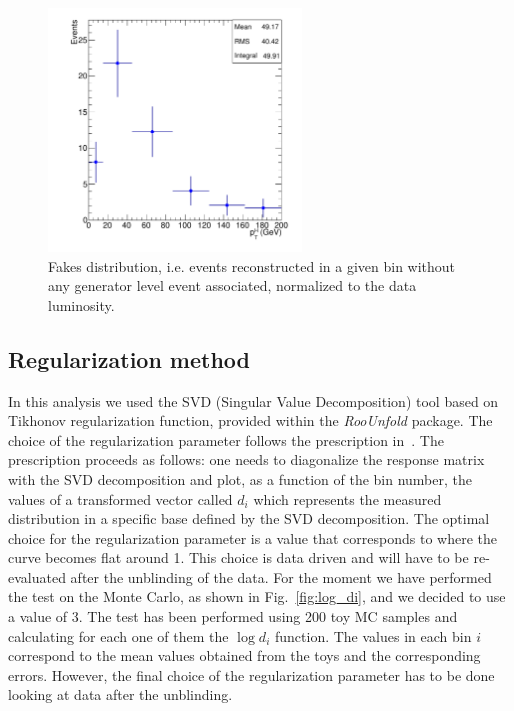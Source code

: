 \begin{figure}[b]
\centering
\includegraphics[width=0.6\textwidth]{images/fakes.pdf}
\caption{Fakes distribution, i.e. events reconstructed in a given bin without any generator level event associated, normalized to the data luminosity.}
\label{fig:fakes}
\end{figure}

\subsection{Regularization method}\label{sec:regularization}
In this analysis we used the SVD (Singular Value Decomposition) tool based on Tikhonov regularization function, provided within the \textit{RooUnfold} package. The choice of the regularization parameter follows the prescription in~\cite{Hocker:1995kb}. The prescription proceeds as follows: one needs to diagonalize the response matrix with the SVD decomposition and plot, as a function of the bin number, the values of a transformed vector called $d_{i}$ which represents the measured distribution in a specific base defined by the SVD decomposition. The optimal choice for the regularization parameter is a value that corresponds to where the curve becomes flat around 1.    
This choice is data driven and will have to be re-evaluated after the unblinding of the data. 
For the moment we have performed the test on the Monte Carlo, as shown in Fig.~\ref{fig:log_di}, and we decided to use a value of 3.
The test has been performed using 200 toy MC samples and calculating for each one of them the $\log{d_i}$ function. The values in each bin $i$ correspond to the mean values obtained from the toys and the corresponding errors.
However, the final choice of the regularization parameter has to be done looking at data after the unblinding.

